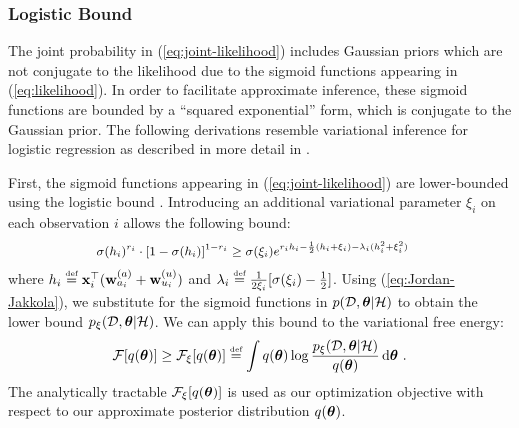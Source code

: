 \subsubsection{Logistic Bound}
The joint probability in (\ref{eq:joint-likelihood}) includes Gaussian priors which are not conjugate to the likelihood due to the sigmoid functions appearing in (\ref{eq:likelihood}).
In order to facilitate approximate inference, these sigmoid functions are bounded by a ``squared exponential'' form, which is conjugate to the Gaussian prior. 
The following derivations resemble variational inference for logistic regression as described in more detail in \cite{LogisticBound}.

First, the sigmoid functions appearing in (\ref{eq:joint-likelihood}) are lower-bounded using the logistic bound \cite{VB_Methods}.
Introducing an additional variational parameter $\xi_i$ on each observation $i$ allows the following bound:
\begin{equation}
\begingroup\makeatletter\def\f@size{\fsize}\check@mathfonts
\def\maketag@@@#1{\hbox{\m@th\large\normalfont#1}}%
\begin{aligned}
& \sigma(h_i)^{r_i} \cdot \left[ 1- \sigma(h_i)\right]^{1-r_i} \geq  \sigma(\xi_i) e^{r_ih_i-\frac{1}{2}(h_i+\xi_i)-\lambda_i(h_i^2+\xi_i^2)}
\label{eq:Jordan-Jakkola}
\end{aligned}\endgroup
\end{equation} 
where $h_i \defined \x_i^\top ( \w^{(a)}_{a_i} + \w^{(u)}_{u_i} )$ and
$\lambda_i \defined \frac{1}{2 \xi_i} [ \sigma(\xi_i)-\frac{1}{2} ]$.
Using (\ref{eq:Jordan-Jakkola}), we substitute for the sigmoid functions in $p(\mathcal{D}, \bm{\theta} | \mathcal{H})$
to obtain the lower bound $p_{\xi}(\mathcal{D}, \bm{\theta} | \mathcal{H})$.
We can apply this bound to the variational free energy:
\[
\mathcal{F}[ q(\btheta)] \geq \mathcal{F}_{\xi}[ q(\btheta)] \defined  \int q(\btheta) \log \frac{p_{\xi}(\mathcal{D}, \btheta  | \mathcal{H})}{q(\btheta)} \, \mathrm{d} \btheta \ .
\]
The analytically tractable $\mathcal{F}_{\xi}[ q(\bm{\theta})]$ is used as our optimization objective with respect to our approximate posterior distribution $q(\bm{\theta})$. 



